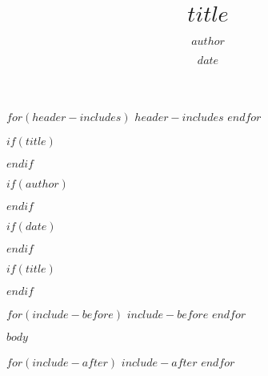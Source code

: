 \documentclass{article}
\begin{document}
$for(header-includes)$
$header-includes$
$endfor$

$if(title)$
\title{$title$}
$endif$

$if(author)$
\author{$author$}
$endif$

$if(date)$
\date{$date$}
$endif$

$if(title)$
\maketitle
$endif$

$for(include-before)$
$include-before$
$endfor$

$body$

$for(include-after)$
$include-after$
$endfor$
\end{document}
